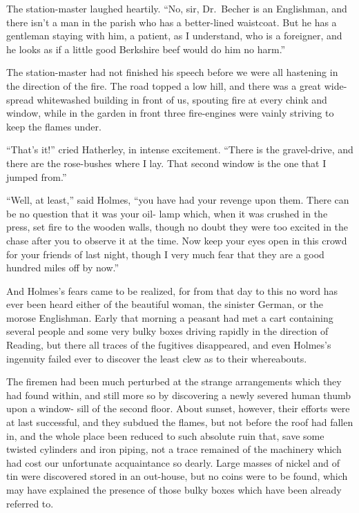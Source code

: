 The station-master laughed heartily. “No, sir, Dr.\ Becher
is an Englishman, and there isn’t a man in the parish who has
a better-lined waistcoat. But he has a gentleman staying with
him, a patient, as I understand, who is a foreigner, and he
looks as if a little good Berkshire beef would do him no
harm.”

The station-master had not finished his speech before we
were all hastening in the direction of the fire. The road
topped a low hill, and there was a great wide-spread whitewashed
building in front of us, spouting fire at every chink
and window, while in the garden in front three fire-engines
were vainly striving to keep the flames under.

“That’s it!” cried Hatherley, in intense excitement. “There
is the gravel-drive, and there are the rose-bushes where I lay.
That second window is the one that I jumped from.”

“Well, at least,” said Holmes, “you have had your revenge
upon them. There can be no question that it was your oil-%
lamp which, when it was crushed in the press, set fire to the
wooden walls, though no doubt they were too excited in the
chase after you to observe it at the time. Now keep your
eyes open in this crowd for your friends of last night, though
I very much fear that they are a good hundred miles off by
now.”

And Holmes’s fears came to be realized, for from that day
to this no word has ever been heard either of the beautiful
woman, the sinister German, or the morose Englishman. Early
that morning a peasant had met a cart containing several
people and some very bulky boxes driving rapidly in the direction
of Reading, but there all traces of the fugitives disappeared,
and even Holmes’s ingenuity failed ever to discover
the least clew as to their whereabouts.

The firemen had been much perturbed at the strange arrangements
which they had found within, and still more so
by discovering a newly severed human thumb upon a window-%
sill of the second floor. About sunset, however, their efforts
were at last successful, and they subdued the flames, but not
before the roof had fallen in, and the whole place been reduced
to such absolute ruin that, save some twisted cylinders and
iron piping, not a trace remained of the machinery which had
cost our unfortunate acquaintance so dearly. Large masses
of nickel and of tin were discovered stored in an out-house,
but no coins were to be found, which may have explained the
presence of those bulky boxes which have been already referred
to.

